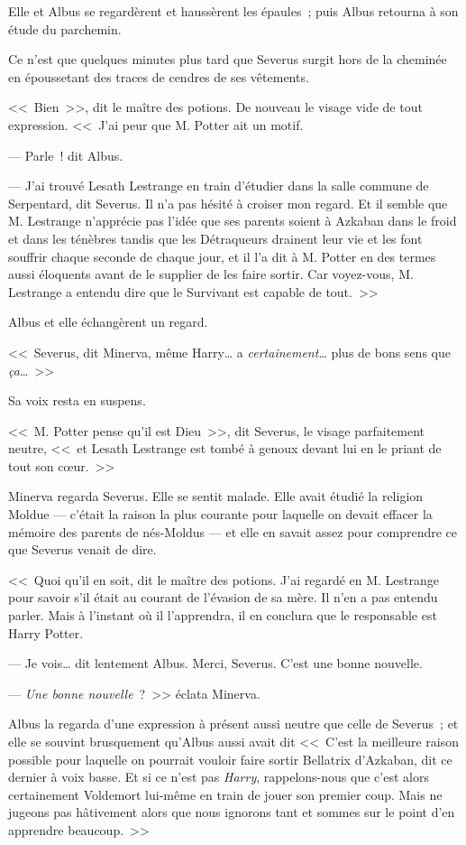 Elle et Albus se regardèrent et haussèrent les épaules~; puis Albus retourna à son étude du parchemin.

Ce n'est que quelques minutes plus tard que Severus surgit hors de la cheminée en époussetant des traces de cendres de ses vêtements.

<<~Bien~>>, dit le maître des potions. De nouveau le visage vide de tout expression. <<~J'ai peur que M. Potter ait un motif.

--- Parle~! dit Albus.

--- J'ai trouvé Lesath Lestrange en train d'étudier dans la salle commune de Serpentard, dit Severus. Il n'a pas hésité à croiser mon regard. Et il semble que M. Lestrange n'apprécie pas l'idée que ses parents soient à Azkaban dans le froid et dans les ténèbres tandis que les Détraqueurs drainent leur vie et les font souffrir chaque seconde de chaque jour, et il l'a dit à M. Potter en des termes aussi éloquents avant de le supplier de les faire sortir. Car voyez-vous, M. Lestrange a entendu dire que le Survivant est capable de tout.~>>

Albus et elle échangèrent un regard.

<<~Severus, dit Minerva, même Harry… a \emph{certainement}… plus de bons sens que \emph{ça}…~>>

Sa voix resta en suspens.

<<~M. Potter pense qu'il est Dieu~>>, dit Severus, le visage parfaitement neutre, <<~et Lesath Lestrange est tombé à genoux devant lui en le priant de tout son cœur.~>>

Minerva regarda Severus. Elle se sentit malade. Elle avait étudié la religion Moldue — c'était la raison la plus courante pour laquelle on devait effacer la mémoire des parents de nés-Moldus — et elle en savait assez pour comprendre ce que Severus venait de dire.

<<~Quoi qu'il en soit, dit le maître des potions. J'ai regardé en M. Lestrange pour savoir s'il était au courant de l'évasion de sa mère. Il n'en a pas entendu parler. Mais à l'instant où il l'apprendra, il en conclura que le responsable est Harry Potter.

--- Je vois… dit lentement Albus. Merci, Severus. C'est une bonne nouvelle.

--- \emph{Une bonne nouvelle}~?~>> éclata Minerva.

Albus la regarda d'une expression à présent aussi neutre que celle de Severus~; et elle se souvint brusquement qu'Albus aussi avait dit <<~C'est la meilleure raison possible pour laquelle on pourrait vouloir faire sortir Bellatrix d'Azkaban, dit ce dernier à voix basse. Et si ce n'est pas \emph{Harry}, rappelons-nous que c'est alors certainement Voldemort lui-même en train de jouer son premier coup. Mais ne jugeons pas hâtivement alors que nous ignorons tant et sommes sur le point d'en apprendre beaucoup.~>>

